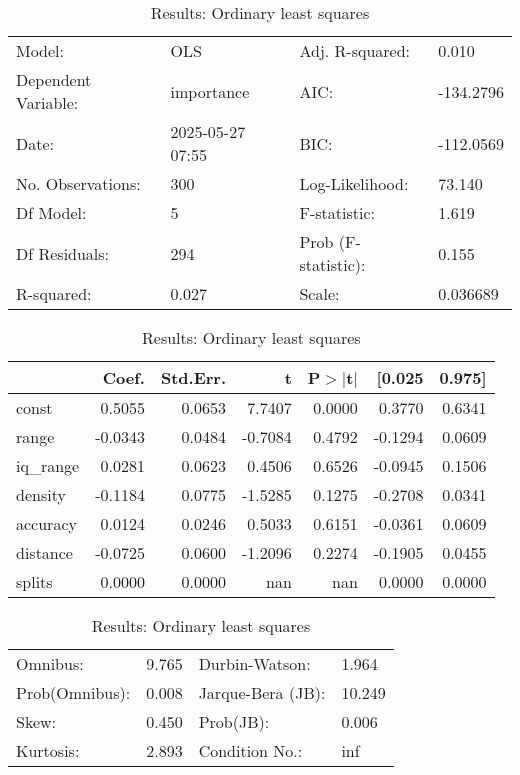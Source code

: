 \begin{table}
\caption{Results: Ordinary least squares}
\label{}
\begin{center}
\begin{tabular}{llll}
\hline
Model:              & OLS              & Adj. R-squared:     & 0.010      \\
Dependent Variable: & importance       & AIC:                & -134.2796  \\
Date:               & 2025-05-27 07:55 & BIC:                & -112.0569  \\
No. Observations:   & 300              & Log-Likelihood:     & 73.140     \\
Df Model:           & 5                & F-statistic:        & 1.619      \\
Df Residuals:       & 294              & Prob (F-statistic): & 0.155      \\
R-squared:          & 0.027            & Scale:              & 0.036689   \\
\hline
\end{tabular}
\end{center}

\begin{center}
\begin{tabular}{lrrrrrr}
\hline
          &   Coef. & Std.Err. &       t & P$> |$t$|$ &  [0.025 & 0.975]  \\
\hline
const     &  0.5055 &   0.0653 &  7.7407 &      0.0000 &  0.3770 & 0.6341  \\
range     & -0.0343 &   0.0484 & -0.7084 &      0.4792 & -0.1294 & 0.0609  \\
iq\_range &  0.0281 &   0.0623 &  0.4506 &      0.6526 & -0.0945 & 0.1506  \\
density   & -0.1184 &   0.0775 & -1.5285 &      0.1275 & -0.2708 & 0.0341  \\
accuracy  &  0.0124 &   0.0246 &  0.5033 &      0.6151 & -0.0361 & 0.0609  \\
distance  & -0.0725 &   0.0600 & -1.2096 &      0.2274 & -0.1905 & 0.0455  \\
splits    &  0.0000 &   0.0000 &     nan &         nan &  0.0000 & 0.0000  \\
\hline
\end{tabular}
\end{center}

\begin{center}
\begin{tabular}{llll}
\hline
Omnibus:       & 9.765 & Durbin-Watson:    & 1.964   \\
Prob(Omnibus): & 0.008 & Jarque-Bera (JB): & 10.249  \\
Skew:          & 0.450 & Prob(JB):         & 0.006   \\
Kurtosis:      & 2.893 & Condition No.:    & inf     \\
\hline
\end{tabular}
\end{center}
\end{table}
